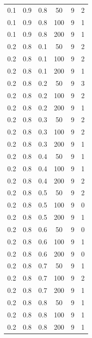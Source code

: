 \documentclass[a4paper,14pt, unknownkeysallowed]{extreport}
\begin{document}
\begin{center}
\begin{longtable}[c]{|c|c|c|c|c|c|}
        \hline
         0.1 &  0.9 &  0.8 &   50 &     9 &     2 \\
         0.1 &  0.9 &  0.8 &  100 &     9 &     1 \\
         0.1 &  0.9 &  0.8 &  200 &     9 &     1 \\
        \hline
         0.2 &  0.8 &  0.1 &   50 &     9 &     2 \\
         0.2 &  0.8 &  0.1 &  100 &     9 &     2 \\
         0.2 &  0.8 &  0.1 &  200 &     9 &     1 \\
        \hline
         0.2 &  0.8 &  0.2 &   50 &     9 &     3 \\
         0.2 &  0.8 &  0.2 &  100 &     9 &     2 \\
         0.2 &  0.8 &  0.2 &  200 &     9 &     1 \\
        \hline
         0.2 &  0.8 &  0.3 &   50 &     9 &     2 \\
         0.2 &  0.8 &  0.3 &  100 &     9 &     2 \\
         0.2 &  0.8 &  0.3 &  200 &     9 &     1 \\
        \hline
         0.2 &  0.8 &  0.4 &   50 &     9 &     1 \\
         0.2 &  0.8 &  0.4 &  100 &     9 &     1 \\
         0.2 &  0.8 &  0.4 &  200 &     9 &     2 \\
        \hline
         0.2 &  0.8 &  0.5 &   50 &     9 &     2 \\
         0.2 &  0.8 &  0.5 &  100 &     9 &     0 \\
         0.2 &  0.8 &  0.5 &  200 &     9 &     1 \\
        \hline
         0.2 &  0.8 &  0.6 &   50 &     9 &     0 \\
         0.2 &  0.8 &  0.6 &  100 &     9 &     1 \\
         0.2 &  0.8 &  0.6 &  200 &     9 &     0 \\
        \hline
         0.2 &  0.8 &  0.7 &   50 &     9 &     1 \\
         0.2 &  0.8 &  0.7 &  100 &     9 &     2 \\
         0.2 &  0.8 &  0.7 &  200 &     9 &     1 \\
        \hline
         0.2 &  0.8 &  0.8 &   50 &     9 &     1 \\
         0.2 &  0.8 &  0.8 &  100 &     9 &     1 \\
         0.2 &  0.8 &  0.8 &  200 &     9 &     1 \\

\end{longtable}
\end{center}
\end{document}
